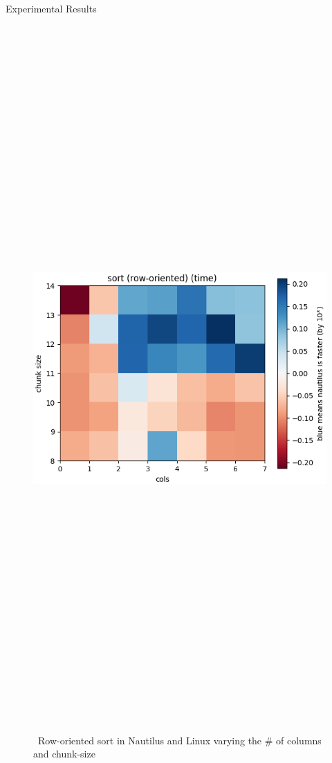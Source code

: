 \begin{block}{Experimental Results}
 
  \begin{figure}
    \includegraphics[height=27cm]{plots/sort_2d.png}
    \caption{~Row-oriented sort in Nautilus and Linux varying the \# of columns and chunk-size}
    \label{fig:sort_2d}
  \end{figure}


\end{block}
